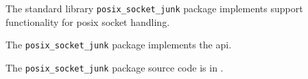 
The standard library {\tt posix\_socket\_junk} package implements support functionality for posix socket handling.

The {\tt posix\_socket\_junk} package implements the  api.

The {\tt posix\_socket\_junk} package source code is in .

